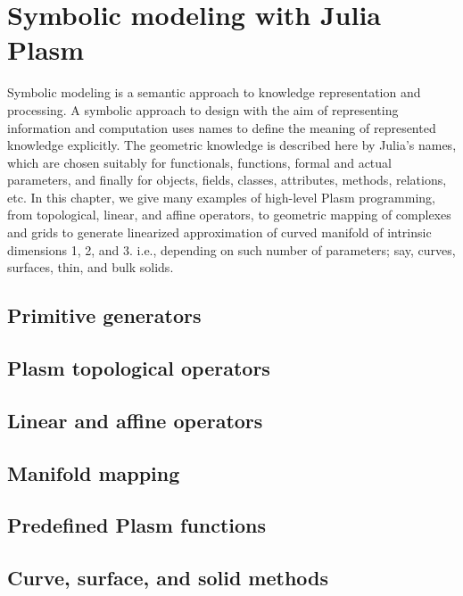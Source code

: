 
\chapter{Symbolic modeling with Julia Plasm}
\label{chapt:5}

Symbolic modeling is a semantic approach to knowledge representation and processing. A  symbolic approach to design with the aim of representing information and computation uses names to define the meaning of represented knowledge explicitly. The geometric knowledge is described here by Julia's names, which are chosen suitably for functionals, functions, formal and actual parameters, and finally for objects, fields, classes, attributes, methods, relations, etc. In this chapter, we give many examples of high-level Plasm programming, from topological, linear, and affine operators, to geometric mapping of complexes and grids to generate linearized approximation of curved manifold of intrinsic dimensions 1, 2, and 3. i.e., depending on such number of parameters; say, curves, surfaces, thin, and bulk solids.

\section{ Primitive generators}\label{sect:5-1}


\section{ Plasm topological operators}\label{sect:5-2}


\section{ Linear and affine operators}\label{sect:5-3}


\section{ Manifold mapping}\label{sect:5-4}


\section{ Predefined Plasm functions}\label{sect:5-5}


\section{ Curve, surface, and solid methods}\label{sect:5-6}


